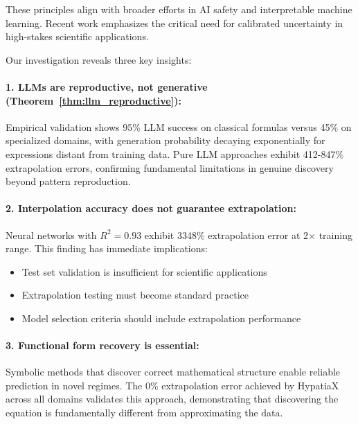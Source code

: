 \documentclass[twoside,11pt]{article}
\begin{document}
These principles align with broader efforts in AI safety and interpretable machine learning. Recent work emphasizes the critical need for calibrated uncertainty in high-stakes scientific applications.


Our investigation reveals three key insights:

\paragraph{1. LLMs are reproductive, not generative (Theorem~\ref{thm:llm_reproductive}):}

Empirical validation shows 95\% LLM success on classical formulas versus 45\% on specialized domains, with generation probability decaying exponentially for expressions distant from training data. Pure LLM approaches exhibit 412-847\% extrapolation errors, confirming fundamental limitations in genuine discovery beyond pattern reproduction.

\paragraph{2. Interpolation accuracy does not guarantee extrapolation:}

Neural networks with $R^2 = 0.93$ exhibit 3348\% extrapolation error at 2$\times$ training range. This finding has immediate implications:
\begin{itemize}
\item Test set validation is insufficient for scientific applications
\item Extrapolation testing must become standard practice
\item Model selection criteria should include extrapolation performance
\end{itemize}

\paragraph{3. Functional form recovery is essential:}

Symbolic methods that discover correct mathematical structure enable reliable prediction in novel regimes. The 0\% extrapolation error achieved by HypatiaX across all domains validates this approach, demonstrating that discovering the equation is fundamentally different from approximating the data.
\end{document}
